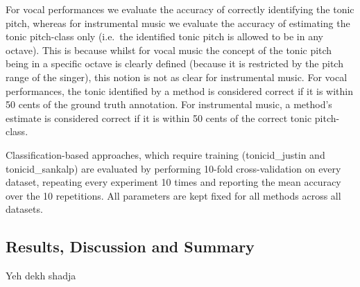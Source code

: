 {For vocal performances we evaluate the accuracy of correctly identifying the tonic pitch, whereas for instrumental music we evaluate the accuracy of estimating the tonic pitch-class only (i.e.~the identified tonic pitch is allowed to be in any octave). This is because whilst for vocal music the concept of the tonic pitch being in a specific octave is clearly defined (because it is restricted by the pitch range of the singer), this notion is not as clear for instrumental music. For vocal performances, the tonic identified by a method is considered correct if it is within 50 cents of the ground truth annotation. For instrumental music, a method's estimate is considered correct if it is within 50 cents of the correct tonic pitch-class.

Classification-based approaches, which require training (\acrshort{tonicid_justin} and \acrshort{tonicid_sankalp}) are evaluated by performing 10-fold cross-validation on every dataset, repeating
every experiment 10 times and reporting the mean accuracy over the 10 repetitions. All parameters are kept fixed for all methods across all datasets.

\subsection{Results, Discussion and Summary}
\label{sec:pre_processing_tonic_identification_results}

Yeh dekh
\acrshort{shadja}

}
